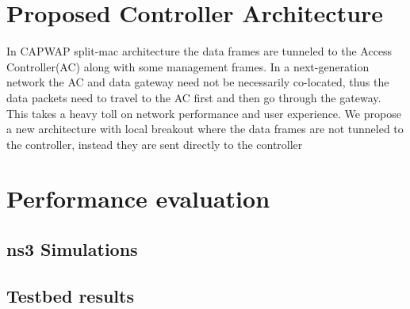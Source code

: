 \documentclass[12pt]{article}
\begin{document}
    
    
    
    
    
    
    
    
    
    
    
    
     
    
    \section{Proposed Controller Architecture}
	  In CAPWAP split-mac architecture the data frames are tunneled to the Access Controller(AC) along with some management frames\cite{RFC5416}. In a next-generation network the AC and data gateway need not be necessarily co-located, thus the data packets need to travel to the AC first and then go through the gateway. This takes a heavy toll on network performance and user experience. We propose a new architecture with local breakout where the data frames are not tunneled to the controller, instead they are sent directly to the controller
    
    \section{Performance evaluation}
    \subsection{ns3 Simulations}
    
    \subsection{Testbed results}
    
    
    
   
     
     
    
    
    
  
\end{document}
